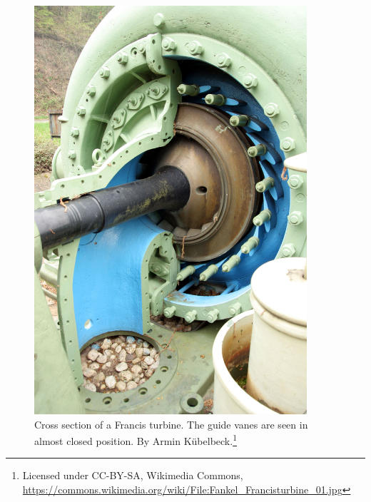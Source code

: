         \begin{figure}
            \begin{minipage}[b]{0.49\linewidth}
                \centering
                \includegraphics[width = 0.9\textwidth]{report/figures/introduction/francis_turbine.jpg}
                \caption{Cross section of a Francis turbine. The guide vanes are seen in almost closed position. By Armin Kübelbeck.\footnote{Licensed under CC-BY-SA, Wikimedia Commons, \url{https://commons.wikimedia.org/wiki/File:Fankel_Francisturbine_01.jpg}}}
                \label{fig:francis}
            \end{minipage}
            \hfill\vline\hfill
            \begin{minipage}[b]{0.49\linewidth}
                \centering

\end{minipage}
\end{figure}
